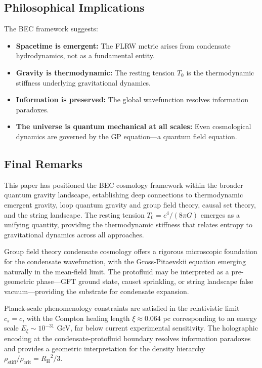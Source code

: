 \documentclass[11pt,a4paper]{article}
\newcommand{\rhocrit}{\ensuremath{\rho_{\mathrm{crit}}}}
\newcommand{\rhostiff}{\ensuremath{\rho_{\mathrm{stiff}}}}
\newcommand{\Tzero}{\ensuremath{T_0}}
\newcommand{\cs}{\ensuremath{c_s}}
\newcommand{\RH}{\ensuremath{R_{\mathrm{H}}}}
\theoremstyle{definition}
\theoremstyle{remark}
\begin{document}
\subsection{Philosophical Implications}
\label{sec:philosophical}

The BEC framework suggests:
\begin{itemize}
\item \textbf{Spacetime is emergent:} The FLRW metric arises from condensate hydrodynamics, not as a fundamental entity.
\item \textbf{Gravity is thermodynamic:} The resting tension $\Tzero$ is the thermodynamic stiffness underlying gravitational dynamics.
\item \textbf{Information is preserved:} The global wavefunction resolves information paradoxes.
\item \textbf{The universe is quantum mechanical at all scales:} Even cosmological dynamics are governed by the GP equation---a quantum field equation.
\end{itemize}

\subsection{Final Remarks}
\label{sec:final_remarks}

This paper has positioned the BEC cosmology framework within the broader quantum gravity landscape, establishing deep connections to thermodynamic emergent gravity, loop quantum gravity and group field theory, causal set theory, and the string landscape. The resting tension $\Tzero = c^4/(8\pi G)$ emerges as a unifying quantity, providing the thermodynamic stiffness that relates entropy to gravitational dynamics across all approaches.

Group field theory condensate cosmology offers a rigorous microscopic foundation for the condensate wavefunction, with the Gross-Pitaevskii equation emerging naturally in the mean-field limit. The protofluid may be interpreted as a pre-geometric phase---GFT ground state, causet sprinkling, or string landscape false vacuum---providing the substrate for condensate expansion.

Planck-scale phenomenology constraints are satisfied in the relativistic limit $\cs = c$, with the Compton healing length $\xi \approx 0.064$ pc corresponding to an energy scale $E_\xi \sim 10^{-31}$ GeV, far below current experimental sensitivity. The holographic encoding at the condensate-protofluid boundary resolves information paradoxes and provides a geometric interpretation for the density hierarchy $\rhostiff/\rhocrit = \RH^2/3$.
\end{document}
